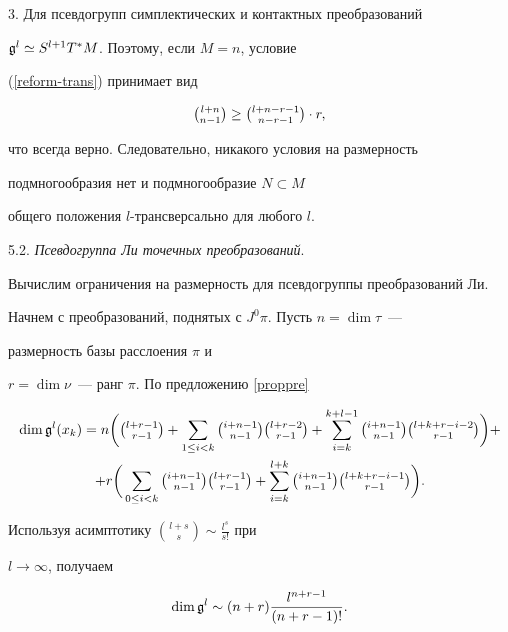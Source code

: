 3. Для псевдогрупп симплектических и контактных преобразований


${\frak g}^l\simeq S^{l+1}T^*M$. Поэтому, если $M=n$, условие


(\ref{reform-trans}) принимает вид


$$


\tbinom{l+n}{n-1}\ge\tbinom{l+n-r-1}{n-r-1}\cdot r,


$$


что всегда верно. Следовательно, никакого условия на размерность


подмногообразия нет и подмногообразие $N\subset M$


общего положения $l$-трансверсально для любого $l$.


\medskip





5.2. {\it Псевдогруппа Ли точечных преобразований}.


Вычислим ограничения на размерность для псевдогруппы преобразований Ли.


Начнем с преобразований, поднятых с $J^0\pi$. Пусть $n=\dim\tau$~---


размерность базы расслоения $\pi$ и


$r=\dim\nu$~--- ранг $\pi$. По предложению \ref{proppre}


\begin{multline*}


\dim\g^l(x_k)=n\bigg(\tbinom{l+r-1}{r-1}+\sum_{1\le


i<k}\tbinom{i+n-1}{n-1}\tbinom{l+r-2}{r-1}+


\sum_{i=k}^{k+l-1}\tbinom{i+n-1}{n-1}\tbinom{l+k+r-i-2}{r-1}\bigg)+\\


+r\bigg(\sum_{0\le i<k}\tbinom{i+n-1}{n-1}\tbinom{l+r-1}{r-1}+


\sum_{i=k}^{l+k}\tbinom{i+n-1}{n-1}\tbinom{l+k+r-i-1}{r-1}\bigg).


\end{multline*}


Используя асимптотику $\binom{l+s}s\sim\frac{l^s}{s!}$ при


$l\to\infty$, получаем


\begin{equation}


\label{fo1}


\dim\g^l\sim (n+r)\frac{l^{n+r-1}}{(n+r-1)!}.


\end{equation}






